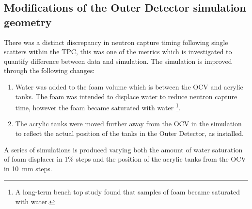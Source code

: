 \subsection{Modifications of the Outer Detector simulation geometry}\label{sec:VetoEff/GeometryEdits}
There was a distinct discrepancy in neutron capture timing following single scatters within the TPC, this was one of the metrics which is investigated to quantify difference between data and simulation.
The simulation is improved through the following changes:
\begin{enumerate}
	\item Water was added to the foam volume which is between the OCV and acrylic tanks. The foam was intended to displace water to reduce neutron capture time, however the foam became saturated with water \footnote{A long-term bench top study found that samples of foam became saturated with water.}.
	\item The acrylic tanks were moved further away from the OCV in the simulation to reflect the actual position of the tanks in the Outer Detector, as installed.
\end{enumerate}
A series of simulations is produced varying both the amount of water saturation of foam displacer in 1\% steps and the position of the acrylic tanks from the OCV in 10~mm steps.
